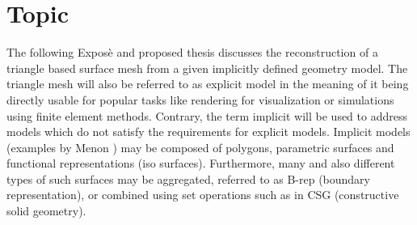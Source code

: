 
\section{Topic}

The following Expos\`e and proposed thesis discusses the reconstruction of a triangle based surface mesh from a given implicitly defined geometry model. The triangle mesh will also be referred to as explicit model in the meaning of it being directly usable for popular tasks like rendering for visualization or simulations using finite element methods. Contrary, the term implicit will be used to address models which do not satisfy the requirements for explicit models. Implicit models (\cf examples by Menon \cite{implicit_techniques}) may be composed of polygons, parametric surfaces and functional representations (iso surfaces). Furthermore, many and also different types of such surfaces may be aggregated, referred to as B-rep (boundary representation), or combined using set operations such as in CSG (constructive solid geometry).

